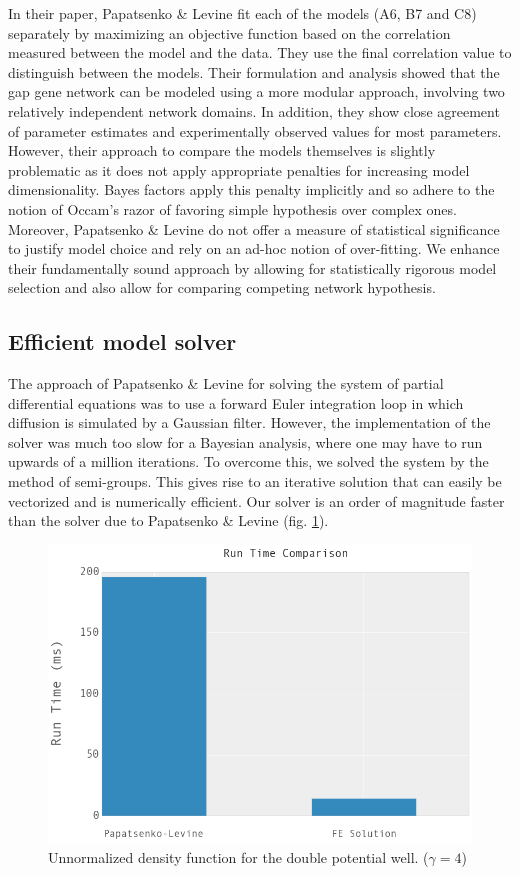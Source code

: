 In their paper, Papatsenko \& Levine \cite{papatsenko11} fit each of the models (A6, B7 and C8) separately by maximizing an objective function based on the correlation measured between the model and the data. They use the final correlation value to distinguish between the models. Their formulation and analysis showed that the gap gene network can be modeled using a more modular approach, involving two relatively independent network domains. In addition, they show close agreement of parameter estimates and experimentally observed values for most parameters. However, their approach to compare the models themselves is slightly problematic as it does not apply appropriate penalties for increasing model dimensionality. Bayes factors apply this penalty implicitly and so adhere to the notion of Occam's razor of favoring simple hypothesis over complex ones. Moreover, Papatsenko \& Levine do not offer a measure of statistical significance to justify model choice and rely on an ad-hoc notion of over-fitting. We enhance their fundamentally sound approach by allowing for statistically rigorous model selection and also allow for comparing competing network hypothesis. 

\subsection{Efficient model solver}
The approach of Papatsenko \& Levine for solving the system of partial differential equations was to use a forward Euler integration loop in which diffusion is simulated by a Gaussian filter. However, the implementation of the solver was much too slow for a Bayesian analysis, where one may have to run upwards of a million iterations. To overcome this, we solved the system by the method of semi-groups. This gives rise to an iterative solution that can easily be vectorized and is numerically efficient. Our solver is an order of magnitude faster than the solver due to Papatsenko \& Levine (fig. \ref{fig:runtime}).

\begin{figure}[h!]
\centering
\includegraphics[scale=0.55]{tex/embryo/runtime.png}
\caption{Unnormalized density function for the double potential well. ($\gamma = 4$)}
\label{fig:runtime}
\end{figure}

